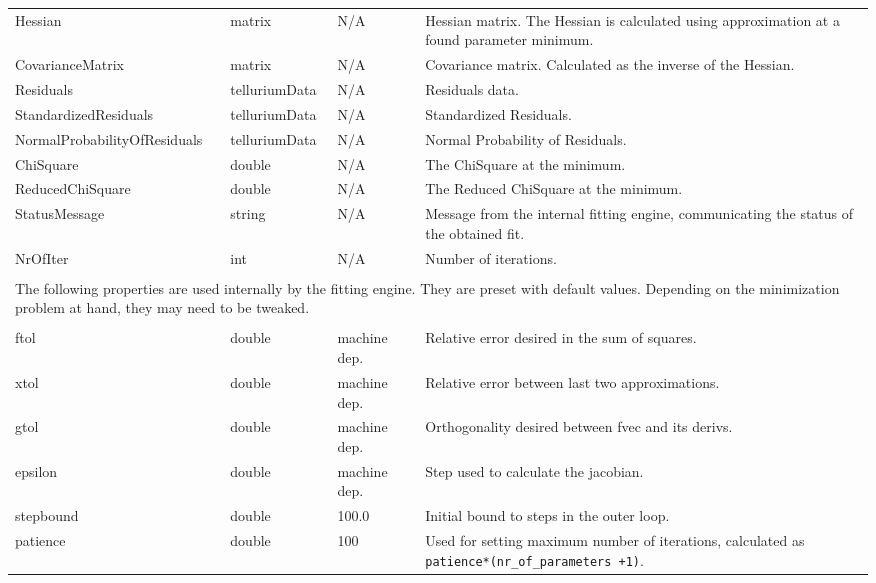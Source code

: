 \begin{landscape}
\begin{longtable}{p{4cm} l p{3cm}  p{10cm}}
Hessian							&	matrix				& N/A    &   Hessian matrix. The Hessian is calculated using approximation at a found parameter minimum. \\
CovarianceMatrix				&	matrix				& N/A    &   Covariance matrix. Calculated as the inverse of the Hessian.\\
Residuals     					& 	telluriumData    	& N/A    &   Residuals data.  \\
StandardizedResiduals			&	telluriumData		& N/A    &   Standardized Residuals.\\
NormalProb\-abilityOfResiduals	&	telluriumData		& N/A    &   Normal Probability of Residuals.\\
ChiSquare						&	double				& N/A    &   The ChiSquare at the minimum.\\
ReducedChiSquare				&	double				& N/A    &   The Reduced ChiSquare at the minimum.\\
StatusMessage					&	string				& N/A    &   Message from the internal fitting engine, communicating the status of the obtained fit.\\
NrOfIter                        &   int                 & N/A    &   Number of iterations. \\[12pt]
\\[2pt]                                                               
\multicolumn{4}{p{19cm}}{The following properties are used internally by the fitting engine. They are preset with default values. Depending on the minimization problem at hand, they may need to be tweaked. } \\[12pt]
\hline %
\\[2pt]                                                               
ftol                            &   double              & machine dep.          &   Relative error desired in the sum of squares. \\
xtol                            &   double              & machine dep.          &   Relative error between last two approximations. \\
gtol                            &   double              & machine dep.          &   Orthogonality desired between fvec and its derivs. \\
epsilon                         &   double              & machine dep.          &   Step used to calculate the jacobian. \\
stepbound                       &   double              & 100.0                 &   Initial bound to steps in the outer loop. \\
patience                        &   double              & 100                   &   Used for setting maximum number of iterations, calculated as \verb|patience*(nr_of_parameters +1)|. \\
                                                        

\end{longtable}
\end{landscape}
